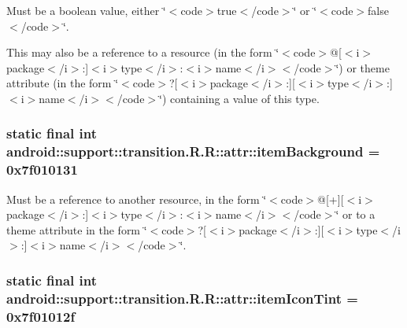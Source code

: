 Must be a boolean value, either \char`\"{}$<$code$>$true$<$/code$>$\char`\"{} or \char`\"{}$<$code$>$false$<$/code$>$\char`\"{}. 

This may also be a reference to a resource (in the form \char`\"{}$<$code$>$@\mbox{[}$<$i$>$package$<$/i$>$:\mbox{]}$<$i$>$type$<$/i$>$:$<$i$>$name$<$/i$>$$<$/code$>$\char`\"{}) or theme attribute (in the form \char`\"{}$<$code$>$?\mbox{[}$<$i$>$package$<$/i$>$:\mbox{]}\mbox{[}$<$i$>$type$<$/i$>$:\mbox{]}$<$i$>$name$<$/i$>$$<$/code$>$\char`\"{}) containing a value of this type. \hypertarget{classandroid_1_1support_1_1transition_1_1_r_1_1attr_07324e572ffe105491625212130688bd}{
\subsubsection[{itemBackground}]{\setlength{\rightskip}{0pt plus 5cm}static final int android::support::transition.R.R::attr::itemBackground = 0x7f010131}}
\label{classandroid_1_1support_1_1transition_1_1_r_1_1attr_07324e572ffe105491625212130688bd}


Must be a reference to another resource, in the form \char`\"{}$<$code$>$@\mbox{[}+\mbox{]}\mbox{[}$<$i$>$package$<$/i$>$:\mbox{]}$<$i$>$type$<$/i$>$:$<$i$>$name$<$/i$>$$<$/code$>$\char`\"{} or to a theme attribute in the form \char`\"{}$<$code$>$?\mbox{[}$<$i$>$package$<$/i$>$:\mbox{]}\mbox{[}$<$i$>$type$<$/i$>$:\mbox{]}$<$i$>$name$<$/i$>$$<$/code$>$\char`\"{}. \hypertarget{classandroid_1_1support_1_1transition_1_1_r_1_1attr_6f950c9eba4999bcaf2e029802fa8a05}{
\subsubsection[{itemIconTint}]{\setlength{\rightskip}{0pt plus 5cm}static final int android::support::transition.R.R::attr::itemIconTint = 0x7f01012f}}
\label{classandroid_1_1support_1_1transition_1_1_r_1_1attr_6f950c9eba4999bcaf2e029802fa8a05}


